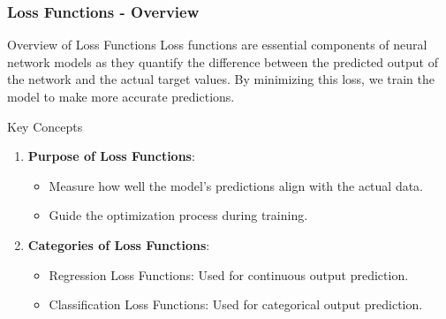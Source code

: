 \documentclass[aspectratio=169]{beamer}
\begin{document}
\begin{frame}[fragile]
    \frametitle{Loss Functions - Overview}
    \begin{block}{Overview of Loss Functions}
        Loss functions are essential components of neural network models as they quantify the difference between the predicted output of the network and the actual target values. 
        By minimizing this loss, we train the model to make more accurate predictions.
    \end{block}

    \begin{block}{Key Concepts}
        \begin{enumerate}
            \item \textbf{Purpose of Loss Functions}:
                \begin{itemize}
                    \item Measure how well the model's predictions align with the actual data.
                    \item Guide the optimization process during training.
                \end{itemize}
            \item \textbf{Categories of Loss Functions}:
                \begin{itemize}
                    \item Regression Loss Functions: Used for continuous output prediction.
                    \item Classification Loss Functions: Used for categorical output prediction.
                \end{itemize}
        \end{enumerate}
    \end{block}
\end{frame}
\end{document}
